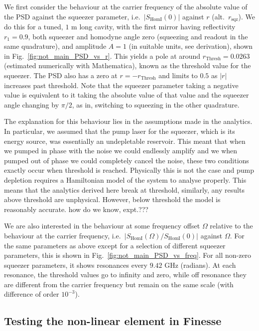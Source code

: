 \documentclass[aps,pra,superscriptaddress,reprint,nofootinbib]{revtex4-1}
\newcommand{\abs}[1]{\left\lvert #1 \right\rvert}
\begin{document}
We first consider the behaviour at the carrier frequency of the absolute value of the PSD against the squeezer parameter, i.e.\ $\abs{S_{\mathrm{HomI}}(0)}$ against $r$ (alt.\ $r_\mathrm{sqz}$). We do this for a tuned, $1$ m long cavity, with the first mirror having reflectivity $r_1 = 0.9$, both squeezer and homodyne angle zero (squeezing and readout in the same quadrature), and amplitude $A = 1$ (in suitable units, see derivation), shown in Fig.~\ref{fig:not_main_PSD_vs_r}. This yields a pole at around $r_\mathrm{Thresh} = 0.0263$ (estimated numerically with Mathematica), known as the threshold value for the squeezer. The PSD also has a zero at $r = -r_\mathrm{Thresh}$ and limits to $0.5$ as $\abs{r}$ increases past threshold. Note that the squeezer parameter taking a negative value is equivalent to it taking the absolute value of that value and the squeezer angle changing by $\pi/2$, as in, switching to squeezing in the other quadrature.


The explanation for this behaviour lies in the assumptions made in the analytics. In particular, we assumed that the pump laser for the squeezer, which is its energy source, was essentially an undepletable reservoir. This meant that when we pumped in phase with the noise we could endlessly amplify and we when pumped out of phase we could completely cancel the noise, these two conditions exactly occur when threshold is reached. Physically this is not the case and pump depletion requires a Hamiltonian model of the system to analyse properly. This means that the analytics derived here break at threshold, similarly, any results above threshold are unphysical.
However, below threshold the model is reasonably accurate. {\Large how do we know, expt.???}


We are also interested in the behaviour at some frequency offset $\Omega$ relative to the behaviour at the carrier frequency, i.e.\ $\abs{S_{\mathrm{HomI}}(\Omega)/S_{\mathrm{HomI}}(0)}$ against $\Omega$. For the same parameters as above except for a selection of different squeezer parameters, this is shown in Fig.~\ref{fig:not_main_PSD_vs_freq}. For all non-zero squeezer parameters, it shows resonances every $9.42$ GHz (radians). At each resonance, the threshold values go to infinity and zero, while off resonance they are different from the carrier frequency but remain on the same scale (with difference of order $10^{-3}$).


\subsection{Testing the non-linear element in Finesse}
\end{document}
